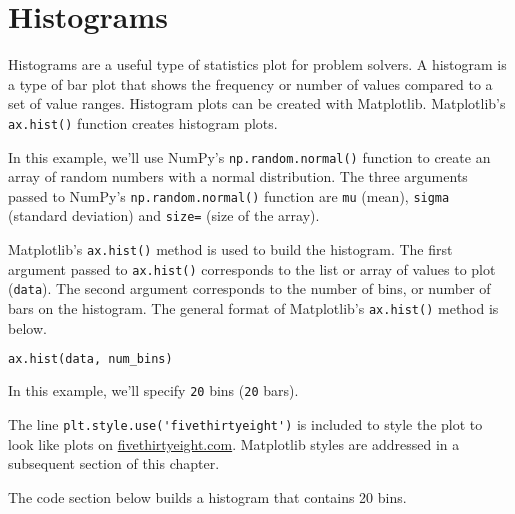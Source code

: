 \documentclass{book}
\newcommand{\passthrough}[1]{#1}
\begin{document}
    
        \hypertarget{histograms}{%
\section{Histograms}\label{histograms}}
    




    
        Histograms are a useful type of statistics plot for problem solvers. A
histogram is a type of bar plot that shows the frequency or number of
values compared to a set of value ranges. Histogram plots can be created
with Matplotlib. Matplotlib's \passthrough{\lstinline!ax.hist()!}
function creates histogram plots.
    




    
        In this example, we'll use NumPy's
\passthrough{\lstinline!np.random.normal()!} function to create an array
of random numbers with a normal distribution. The three arguments passed
to NumPy's \passthrough{\lstinline!np.random.normal()!} function are
\passthrough{\lstinline!mu!} (mean), \passthrough{\lstinline!sigma!}
(standard deviation) and \passthrough{\lstinline!size=!} (size of the
array).

Matplotlib's \passthrough{\lstinline!ax.hist()!} method is used to build
the histogram. The first argument passed to
\passthrough{\lstinline!ax.hist()!} corresponds to the list or array of
values to plot (\passthrough{\lstinline!data!}). The second argument
corresponds to the number of bins, or number of bars on the histogram.
The general format of Matplotlib's \passthrough{\lstinline!ax.hist()!}
method is below.

\begin{lstlisting}[language=Python]
ax.hist(data, num_bins)
\end{lstlisting}

In this example, we'll specify \passthrough{\lstinline!20!} bins
(\passthrough{\lstinline!20!} bars).

The line \passthrough{\lstinline!plt.style.use('fivethirtyeight')!} is
included to style the plot to look like plots on
\href{https://fivethirtyeight.com}{fivethirtyeight.com}. Matplotlib
styles are addressed in a subsequent section of this chapter.

The code section below builds a histogram that contains 20 bins.
    
\end{document}

